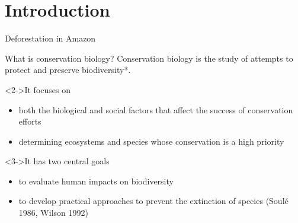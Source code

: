 \section{Introduction}
{
	\begin{frame}{Deforestation in Amazon}
	\centering
\end{frame}
}

{
	\begin{frame}[t]{What is conservation biology?}
Conservation biology is the study of attempts to protect and preserve \alert{biodiversity}*.
\begin{block}<2->{It focuses on}
	\begin{itemize}		
		\item<2-> both the biological and social factors that affect the success of conservation efforts
		\item<2-> determining ecosystems and species whose conservation is a high priority
	\end{itemize}
\end{block}

\begin{block}<3->{It has two central goals}
	\begin{itemize}		
		\item<3-> to evaluate human impacts on biodiversity
		\item<3-> to develop practical approaches to prevent the extinction of species \cite{wilson1992diversity} (Soulé 1986, Wilson 1992)
	\end{itemize}
\end{block}
\end{frame}}


